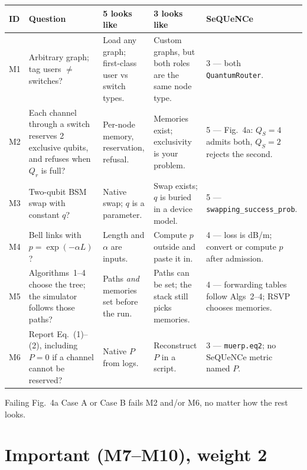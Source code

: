 \documentclass[11pt]{article}
\begin{document}
{\small
\begin{center}
\begin{tabularx}{\textwidth}{@{}l P{1.55in} Y Y P{1.35in}@{}}
\toprule
ID & Question & 5 looks like & 3 looks like & SeQUeNCe \\
\midrule
M1 & Arbitrary graph; tag users $\neq$ switches? & Load any graph; first-class user vs switch types. & Custom graphs, but both roles are the same node type. & 3 --- both \texttt{QuantumRouter}. \\
M2 & Each channel through a switch reserves 2 exclusive qubits, and refuses when $Q_r$ is full? & Per-node memory, reservation, refusal. & Memories exist; exclusivity is your problem. & 5 --- Fig.~4a: $Q_S=4$ admits both, $Q_S=2$ rejects the second. \\
M3 & Two-qubit BSM swap with constant $q$? & Native swap; $q$ is a parameter. & Swap exists; $q$ is buried in a device model. & 5 --- \texttt{swapping\_success\_prob}. \\
M4 & Bell links with $p=\exp(-\alpha L)$? & Length and $\alpha$ are inputs. & Compute $p$ outside and paste it in. & 4 --- loss is dB/m; convert or compute $p$ after admission. \\
M5 & Algorithms~1--4 choose the tree; the simulator follows those paths? & Paths \emph{and} memories set before the run. & Paths can be set; the stack still picks memories. & 4 --- forwarding tables follow Algs~2--4; RSVP chooses memories. \\
M6 & Report Eq.~(1)--(2), including $P=0$ if a channel cannot be reserved? & Native $P$ from logs. & Reconstruct $P$ in a script. & 3 --- \texttt{muerp.eq2}; no SeQUeNCe metric named $P$. \\
\bottomrule
\end{tabularx}
\end{center}}

Failing Fig.~4a Case A or Case B fails M2 and/or M6, no matter how the rest looks.

\section{Important (M7--M10), weight 2}
\end{document}
